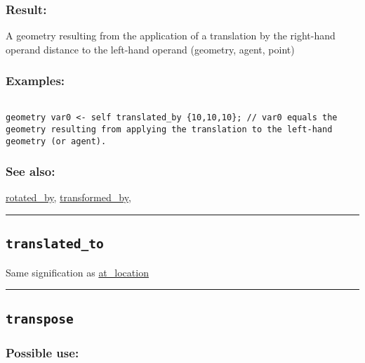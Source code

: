 \documentclass[]{book}
\theoremstyle{definition}
\theoremstyle{definition}
\theoremstyle{definition}
\theoremstyle{remark}
\begin{document}
\subsubsection{Result:}\label{result-513}

A geometry resulting from the application of a translation by the
right-hand operand distance to the left-hand operand (geometry, agent,
point)

\subsubsection{Examples:}\label{examples-368}

\begin{verbatim}
 
geometry var0 <- self translated_by {10,10,10}; // var0 equals the geometry resulting from applying the translation to the left-hand geometry (or agent).
\end{verbatim}

\subsubsection{See also:}\label{see-also-210}

\href{OperatorsNR\#rotated_by}{rotated\_by},
\href{OperatorsSZ\#transformed_by}{transformed\_by},

\begin{center}\rule{0.5\linewidth}{\linethickness}\end{center}

\subsection{\texorpdfstring{\texttt{translated\_to}}{translated\_to}}\label{translated_to}

Same signification as \href{OperatorsAA\#at_location}{at\_location}

\begin{center}\rule{0.5\linewidth}{\linethickness}\end{center}

\subsection{\texorpdfstring{\texttt{transpose}}{transpose}}\label{transpose}

\subsubsection{Possible use:}\label{possible-use-532}
\end{document}
